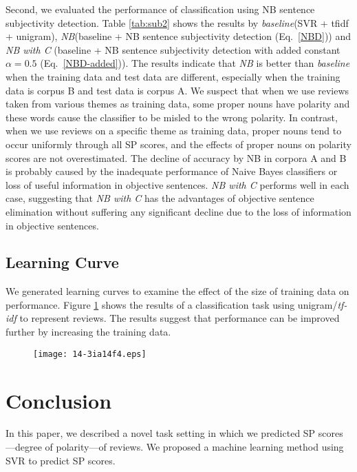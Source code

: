 \documentclass[japanese]{jnlp_1.3d}
\begin{document}
Second, we evaluated the performance of classification using NB sentence subjectivity detection.  Table \ref{tab:sub2} shows the results by \textit{baseline}(SVR + tfidf + unigram), \textit{NB}(baseline + NB sentence subjectivity detection (Eq.~\ref{NBD})) and \textit{NB with C} (baseline + NB sentence subjectivity detection with added constant $\alpha = 0.5$ (Eq.~\ref{NBD-added})). The results indicate that \textit{NB} is better than \textit{baseline} when the training data and test data are different, especially when the training data is corpus B and test data is corpus A. We suspect that when we use reviews taken from various themes as training data, some proper nouns have polarity and these words cause the classifier to be misled to the wrong polarity. In contrast, when we use reviews on a specific theme as training data, proper nouns tend to occur uniformly through all SP scores, and the effects of proper nouns on polarity scores are not overestimated. The decline of accuracy by NB in corpora A and  B is probably caused by the inadequate performance of Naive Bayes classifiers or loss of useful information in objective sentences. \textit{NB with C} performs well in each case, suggesting that \textit{NB with C} has the advantages of objective sentence elimination without suffering any significant decline due to the loss of information in objective sentences.




\subsection{Learning Curve}
\label{Learning Curve}
We generated learning curves to examine the effect of the size of training data on performance. Figure \ref{fig:lc} shows the results of a classification task using unigram/\textit{tf-idf} to represent reviews. The results suggest that performance can be improved further by increasing the training data.



\begin{figure}[t]
\begin{center}
    \texttt{[image: 14-3ia14f4.eps]}
\label{fig:lc}
\end{center}
\end{figure}




\section{Conclusion}
In this paper, we described a novel task setting in which we predicted SP scores---degree of polarity---of reviews. We proposed a machine learning method using SVR to predict SP scores. 
\end{document}
